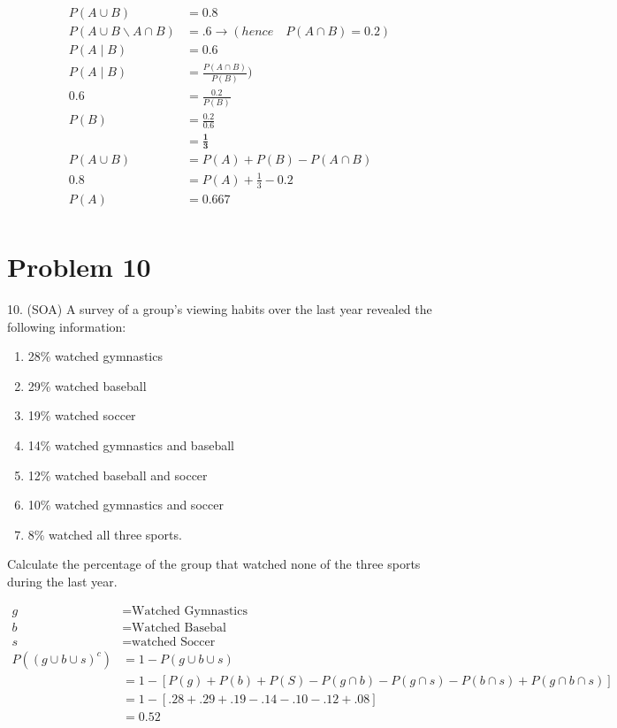 \documentclass{article}
\begin{document}
	\begin{align*}
	P(A\cup B) &= 0.8 \\
	P(A \cup B \backslash A \cap B) &= .6 \rightarrow (hence \quad P(A \cap B) = 0.2)\\
	P(A \mid B) &= 0.6\\
	P(A \mid B) &= \frac{P(A \cap B)}{P(B)})\\
	0.6 &= \frac{0.2}{P(B)}\\
	P(B) &= \frac{0.2}{0.6} \\
	&= \boldsymbol{\frac{1}{3}}\\
	P(A \cup B) &= P(A) + P(B) - P(A \cap B) \\
	0.8 &= P(A) + \frac{1}{3} - 0.2 \\
	P(A) &= \boldsymbol{0.667}\\
	\end{align*}
	
	\section*{Problem 10} 

	10. (SOA) A survey of a group’s viewing habits over the last year revealed the following
information: 

\begin{enumerate}[label=(\roman*)]
		\item 28\% watched gymnastics
    \item 29\% watched baseball
    \item 19\% watched soccer
    \item 14\% watched gymnastics and baseball
    \item 12\% watched baseball and soccer
    \item 10\% watched gymnastics and soccer
    \item  8\% watched all three sports.
\end{enumerate}

Calculate the percentage of the group that watched none of the three sports during the last year.

\begin{align*}
g &= \text{Watched Gymnastics}\\
b &= \text{Watched Basebal}\\
s &= \text{watched Soccer}\\
P((g \cup b \cup s)^c) &= 1 - P(g \cup b \cup s)\\
&= 1-[P(g) + P(b) + P(S) - P(g \cap b) - P(g \cap s) - P(b \cap s) + P(g \cap b \cap s)] \\
&= 1- [.28 + .29 + .19 - .14 - .10 - .12 + .08] \\
&= \boldsymbol{0.52}
\end{align*}
\end{document}
